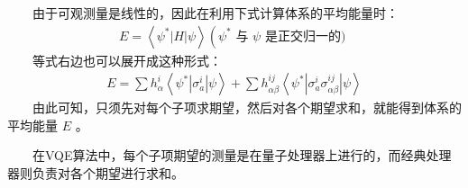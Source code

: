 \documentclass[a4paper,11pt,english]{sphinxmanual}
\begin{document}
\sphinxAtStartPar
  由于可观测量是线性的，因此在利用下式计算体系的平均能量时：
\begin{equation*}
\begin{split}E=\left\langle\psi^{*}|H| \psi\right\rangle\left(\psi^{*} \text { 与 } \psi\right. \text { 是正交归一的) }\end{split}
\end{equation*}
\sphinxAtStartPar
  等式右边也可以展开成这种形式：
\begin{equation*}
\begin{split}E=\sum h_{\alpha}^{i} \left\langle \psi^{*}\left|\sigma_{a}^{i}\right| \psi\right\rangle +\sum h_{\alpha \beta}^{i j}\left\langle\psi^{*}\left|\sigma_{a}^{i} \sigma_{\alpha \beta}^{i j}\right| \psi\right\rangle\end{split}
\end{equation*}
\sphinxAtStartPar
  由此可知，只须先对每个子项求期望，然后对各个期望求和，就能得到体系的平均能量 \(E\) 。

\sphinxAtStartPar
  在VQE算法中，每个子项期望的测量是在量子处理器上进行的，而经典处理器则负责对各个期望进行求和。

\end{document}
